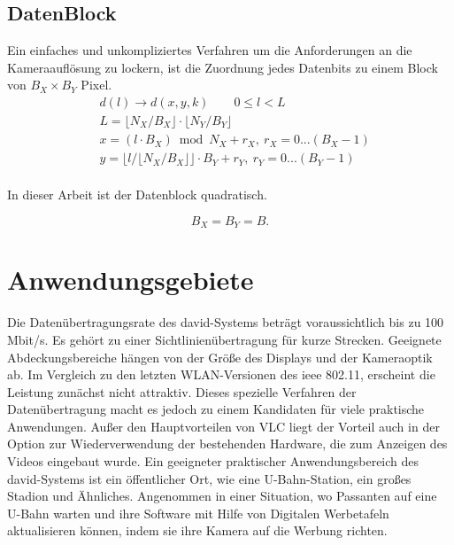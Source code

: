 \subsection{DatenBlock}

Ein einfaches und unkompliziertes Verfahren um die Anforderungen an die Kameraauflösung zu lockern, ist die Zuordnung jedes Datenbits zu einem Block von $B_X \times B_Y$ Pixel.
\begin{equation}
\begin{split}
  & d(l)\rightarrow d(x,y,k) \qquad 0\le l <L \\
  & L=\lfloor N_X/B_X \rfloor \cdot \lfloor N_Y/B_Y \rfloor \\
  & x=(l \cdot B_X) \bmod N_X +r_X, \ r_X =0...(B_X -1) \\
  & y=\lfloor l / \lfloor N_X/B_X \rfloor \rfloor \cdot B_Y +r_Y, \ r_Y =0...(B_Y -1) \\
\end{split}
\end{equation}

%

In dieser Arbeit ist der Datenblock quadratisch.

\begin{equation}
   B_X = B_Y = B.
\end{equation}


\section{Anwendungsgebiete} 

Die Datenübertragungsrate des \gls{david}-Systems beträgt voraussichtlich bis zu 100 Mbit/s. Es gehört zu einer Sichtlinienübertragung für kurze Strecken. Geeignete Abdeckungsbereiche hängen von der Größe des Displays und der Kameraoptik ab. Im Vergleich zu den letzten WLAN-Versionen des \gls{ieee} 802.11, erscheint die Leistung zunächst nicht attraktiv. Dieses spezielle Verfahren der Datenübertragung macht es jedoch zu einem Kandidaten für viele praktische Anwendungen. Außer den Hauptvorteilen von VLC liegt der Vorteil auch in der Option zur Wiederverwendung der bestehenden Hardware, die zum Anzeigen des Videos eingebaut wurde. Ein geeigneter praktischer Anwendungsbereich des \gls{david}-Systems ist ein öffentlicher Ort, wie eine U-Bahn-Station, ein großes Stadion und Ähnliches. Angenommen in einer Situation, wo Passanten auf eine U-Bahn warten und ihre Software mit Hilfe von Digitalen Werbetafeln aktualisieren können, indem sie ihre Kamera auf die Werbung richten.

